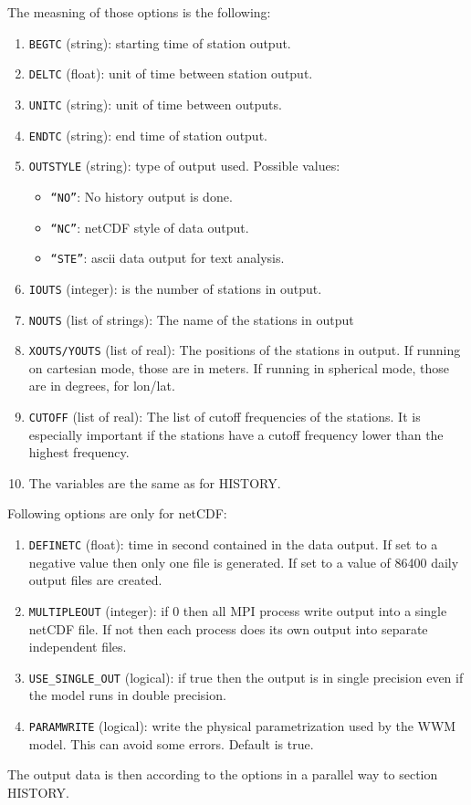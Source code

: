 \documentclass[12pt]{amsart}
\begin{document}
The measning of those options is the following:
\begin{enumerate}
\item {\tt BEGTC} (string): starting time of station output.
\item {\tt DELTC} (float): unit of time between station output.
\item {\tt UNITC} (string): unit of time between outputs.
\item {\tt ENDTC} (string): end time of station output.
\item {\tt OUTSTYLE} (string): type of output used. Possible values:
  \begin{itemize}
  \item {\tt ``NO''}: No history output is done.
  \item {\tt ``NC''}: netCDF style of data output.
  \item {\tt ``STE''}: ascii data output for text analysis.
  \end{itemize}
\item {\tt IOUTS} (integer): is the number of stations in output.
\item {\tt NOUTS} (list of strings): The name of the stations in output
\item {\tt XOUTS/YOUTS} (list of real): The positions of the stations in output. If running on cartesian mode, those are in meters. If running in spherical mode, those are in degrees, for lon/lat.
\item {\tt CUTOFF} (list of real): The list of cutoff frequencies of the stations. It is especially important if the stations have a cutoff frequency lower than the highest frequency.
\item The variables are the same as for HISTORY.
\end{enumerate}
Following options are only for netCDF:
\begin{enumerate}
\item {\tt DEFINETC} (float): time in second contained in the data output.
If set to a negative value then only one file is generated.
If set to a value of 86400 daily output files are created.
\item {\tt MULTIPLEOUT} (integer): if 0 then all MPI process write output into a single netCDF file. If not then each process does its own output into separate independent files.
\item {\tt USE\_SINGLE\_OUT} (logical): if true then the output is in single precision even if the model runs in double precision.
\item {\tt PARAMWRITE} (logical): write the physical parametrization used by the WWM model. This can avoid some errors. Default is true.
\end{enumerate}
The output data is then according to the options in a parallel way to section HISTORY.
\end{document}

